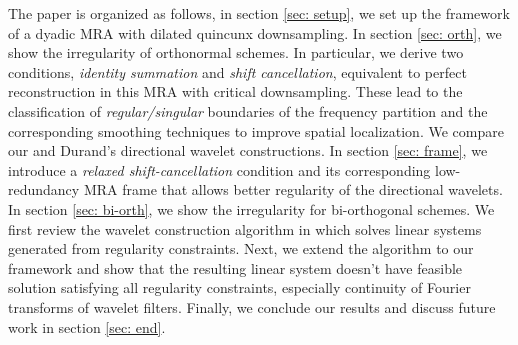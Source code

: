 The paper is organized as follows, in section \ref{sec: setup}, we set up the framework of a dyadic MRA with dilated quincunx downsampling. In section \ref{sec: orth}, we show the irregularity of orthonormal schemes. In particular, we derive two conditions, {\it identity summation} and {\it shift cancellation}, equivalent to perfect reconstruction in this MRA with critical downsampling. These lead to the classification of {\it regular/singular} boundaries of the frequency partition and the corresponding smoothing techniques to improve spatial localization. We compare our and Durand's directional wavelet constructions. 
In section \ref{sec: frame}, we introduce a {\it relaxed shift-cancellation} condition and its corresponding low-redundancy MRA frame that allows better regularity of the directional wavelets. 
In section \ref{sec: bi-orth}, we show the irregularity for bi-orthogonal schemes. We first review the wavelet construction algorithm in \cite{cohen1993compactly} which solves linear systems generated from regularity constraints. Next, we extend the algorithm to our framework and show that the resulting linear system doesn't have feasible solution satisfying all regularity constraints, especially continuity of Fourier transforms of wavelet filters.  
Finally, we conclude our results and discuss future work in section \ref{sec: end}.
